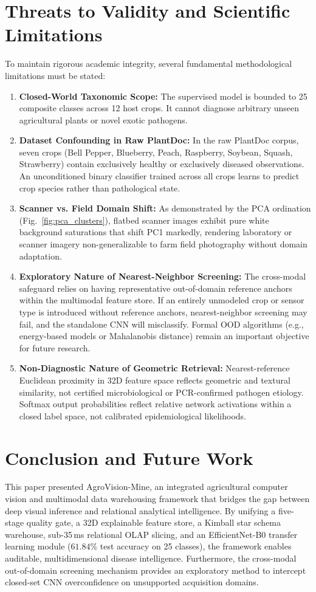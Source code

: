 \documentclass[conference,a4paper]{IEEEtran}
\begin{document}
\section{Threats to Validity and Scientific Limitations}
To maintain rigorous academic integrity, several fundamental methodological limitations must be stated:
\begin{enumerate}
    \item \textbf{Closed-World Taxonomic Scope:} The supervised model is bounded to 25 composite classes across 12 host crops. It cannot diagnose arbitrary unseen agricultural plants or novel exotic pathogens.
    \item \textbf{Dataset Confounding in Raw PlantDoc:} In the raw PlantDoc corpus, seven crops (Bell Pepper, Blueberry, Peach, Raspberry, Soybean, Squash, Strawberry) contain exclusively healthy or exclusively diseased observations. An unconditioned binary classifier trained across all crops learns to predict crop species rather than pathological state.
    \item \textbf{Scanner vs. Field Domain Shift:} As demonstrated by the PCA ordination (Fig.~\ref{fig:pca_clusters}), flatbed scanner images exhibit pure white background saturations that shift PC1 markedly, rendering laboratory or scanner imagery non-generalizable to farm field photography without domain adaptation.
    \item \textbf{Exploratory Nature of Nearest-Neighbor Screening:} The cross-modal safeguard relies on having representative out-of-domain reference anchors within the multimodal feature store. If an entirely unmodeled crop or sensor type is introduced without reference anchors, nearest-neighbor screening may fail, and the standalone CNN will misclassify. Formal OOD algorithms (e.g., energy-based models or Mahalanobis distance) remain an important objective for future research.
    \item \textbf{Non-Diagnostic Nature of Geometric Retrieval:} Nearest-reference Euclidean proximity in 32D feature space reflects geometric and textural similarity, not certified microbiological or PCR-confirmed pathogen etiology. Softmax output probabilities reflect relative network activations within a closed label space, not calibrated epidemiological likelihoods.
\end{enumerate}

\section{Conclusion and Future Work}
This paper presented AgroVision-Mine, an integrated agricultural computer vision and multimodal data warehousing framework that bridges the gap between deep visual inference and relational analytical intelligence. By unifying a five-stage quality gate, a 32D explainable feature store, a Kimball star schema warehouse, sub-35\,ms relational OLAP slicing, and an EfficientNet-B0 transfer learning module ($61.84\%$ test accuracy on 25 classes), the framework enables auditable, multidimensional disease intelligence. Furthermore, the cross-modal out-of-domain screening mechanism provides an exploratory method to intercept closed-set CNN overconfidence on unsupported acquisition domains.
\end{document}
